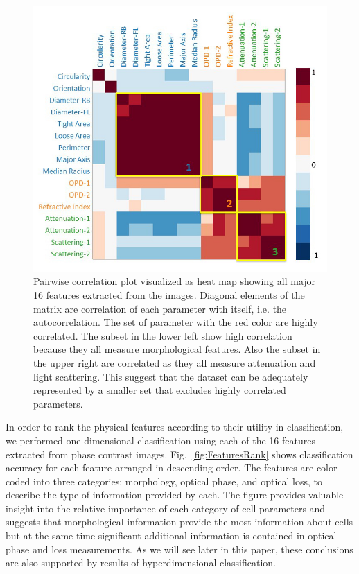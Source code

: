 \documentclass[aps,pra,preprint,superscriptaddress]{revtex4-1}
\begin{document}
\begin{figure}
\includegraphics[scale=0.6]{FigureCorrelation.jpg}
\caption{\label{fig:Correlation} Pairwise correlation plot visualized as heat map showing all major 16 features extracted from the images. Diagonal elements of the matrix are correlation of each parameter with itself, i.e. the autocorrelation. The set of parameter with the red color are highly correlated. The subset in the lower left show high correlation because they all measure morphological features. Also the subset in the upper right are correlated as they all measure attenuation and light scattering. This suggest that the dataset can be adequately represented by a smaller set that excludes highly correlated parameters. }
\end{figure}

In order to rank the physical features according to their utility in classification, we performed one dimensional classification using each of the 16 features extracted from phase contrast images. Fig.~\ref{fig:FeaturesRank} shows classification accuracy for each feature arranged in descending order. The features are color coded into three categories: morphology, optical phase, and optical loss, to describe the type of information provided by each. The figure provides valuable insight into the relative importance of each category of cell parameters and suggests that morphological information provide the most information about cells but at the same time significant additional information is contained in optical phase and loss measurements. As we will see later in this paper, these conclusions are also supported by results of hyperdimensional classification.
\end{document}
